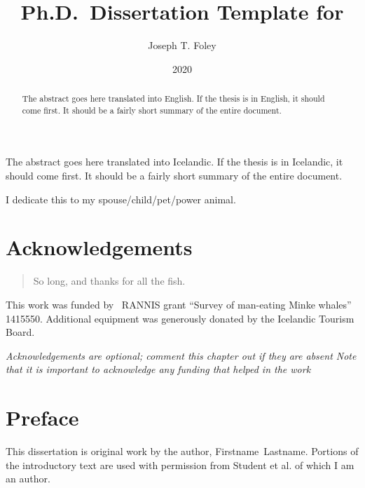 \documentclass[12pt,a4paper,titlepage]{memoir}
\title{Ph.D.\ Dissertation Template for \theInstitution{}}
\author{Joseph T. Foley}%
\date{2020}{2}{2}%
\begin{document}
\maketitle
\copyrightpage{}
\signaturepage{}
\archivesigpage{}

\begin{abstract}
  The abstract goes here translated into English.
  If the thesis is in English, it should come first.
  It should be a fairly short summary of the entire document.
\end{abstract}

\begin{abstractIS}
  The abstract goes here translated into Icelandic.
  If the thesis is in Icelandic, it should come first.
  It should be a fairly short summary of the entire document.
\end{abstractIS}

\begin{dedications}
  I dedicate this to my spouse/child/pet/power animal.
\end{dedications}

\enableindents{}%

\chapter*{Acknowledgements} 
\begin{quotation}
So long, and thanks for all the fish.
\end{quotation}
\vspace{\baselineskip}

This work was funded by \the\year~RANNIS grant ``Survey of man-eating Minke whales'' 1415550.
Additional equipment was generously donated by the Icelandic Tourism Board.

{\em Acknowledgements are optional; comment this chapter out if they are absent
  Note that it is important to acknowledge any funding that helped in the work}



\chapter*{Preface}
This dissertation is original work by the author, Firstname~Lastname.
Portions of the introductory text are used with permission from
Student et al.\cite{student2015awesome} of which I am an author.
\end{document}
